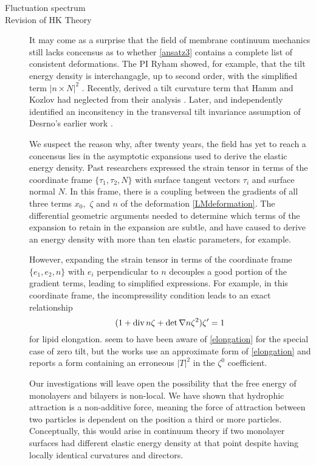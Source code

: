 \begin{description}
\item[Fluctuation spectrum]
\item[Revision of HK Theory]
  It may come as a surprise that the field of membrane continuum mechanics still lacks concensus as to
  whether \eqref{ansatz3} contains a complete list of consistent deformations.
  The PI Ryham showed, for example, that the tilt energy density is interchangagle, up to second order, with
  the simplified term $|n \times N|^2$ \cite{RyKlYaCo16}.
  Recently, \cite{10.1063/1.4990404} derived a tilt curvature term that Hamm and Kozlov had neglected from their analysis \cite{HaKo2000}.
  Later, \cite{https://doi.org/10.1039/C9SM02079A} 
  and \cite{10.1103/PhysRevE.102.042406} independently identified an inconsitency in the transversal tilt invariance
  assumption of Desrno's earlier work \cite{10.1063/1.4990404}.

  We suspect the reason why, after twenty years, the field has yet to reach a concensus 
  lies in the asymptotic expansions used to derive the elastic energy density. 
  Past researchers expressed the strain tensor in
  terms of the coordinate frame $\{\tau_1, \tau_2, N\}$ with surface tangent vectors $\tau_i$ and surface normal $N$.  
  In this frame, there is a coupling between the gradients of all three terms $x_0,$ $\zeta$ and $n$ of the deformation \eqref{LMdeformation}.
  The differential geometric arguments needed to determine which terms of the expansion to retain in the expansion are subtle,
  and have caused \cite{10.1103/PhysRevE.102.042406} to derive an energy density with more than ten elastic parameters, for example. 

  However, expanding the strain tensor in terms of the coordinate frame $\{e_1, e_2, n\}$ with $e_i$ perpendicular to $n$
  decouples a good portion of the gradient terms, leading to simplified expressions. For example,
  in this coordinate frame, the incompressility condition leads to an exact relationship 
  \begin{equation}
    \label{elongation}
    (1 + \operatorname{div} n \zeta + \det \nabla n \zeta^2) \zeta' = 1
  \end{equation}
  for lipid elongation. \cite{HaKo2000} seem to have been aware of \eqref{elongation} for the special case of zero tilt,
  but the works \cite{HaKo2000, https://doi.org/10.1039/C9SM02079A, 10.1063/1.4990404} use an approximate form of \eqref{elongation}
  and \cite{10.1103/PhysRevE.102.042406} reports a form containing an erroneous $|T|^2$ in the $\zeta^0$ coefficient.   

Our investigations will leave open the possibility that the free energy of monolayers and bilayers is non-local. 
We have shown that hydrophic attraction is a non-additive force, meaning the force of attraction between two
particles is dependent on the position a third or more particles. Conceptually, this would arise in continuum theory if two monolayer surfaces
had different elastic energy density at that point despite having locally identical curvatures and directors.


\end{description}


\newpage
